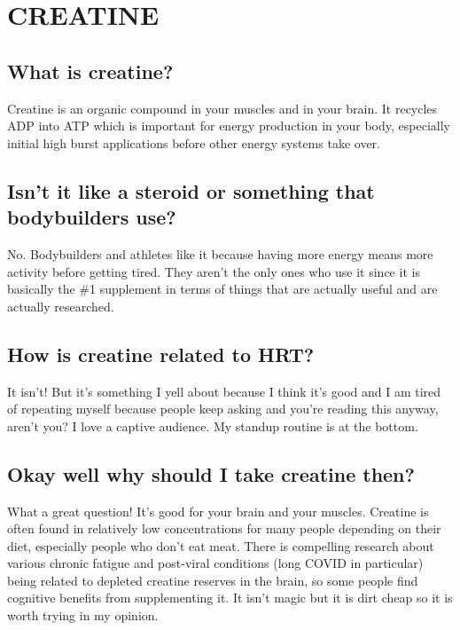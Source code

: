 \documentclass{article}
\begin{document}
\section{CREATINE}

\subsection{What is creatine?}

Creatine is an organic compound in your muscles and in your brain. It recycles ADP into ATP which is important for energy production in your body, especially initial high burst applications before other energy systems take over.

\subsection{Isn’t it like a steroid or something that bodybuilders use?}

No. Bodybuilders and athletes like it because having more energy means more activity before getting tired. They aren’t the only ones who use it since it is basically the \#1 supplement in terms of things that are actually useful and are actually researched. 

\subsection{How is creatine related to HRT?}

It isn’t! But it’s something I yell about because I think it’s good and I am tired of repeating myself because people keep asking and you’re reading this anyway, aren’t you? I love a captive audience. My standup routine is at the bottom.

\subsection{Okay well why should I take creatine then?}

What a great question! It’s good for your brain and your muscles. Creatine is often found in relatively low concentrations for many people depending on their diet, especially people who don’t eat meat. There is compelling research about various chronic fatigue and post-viral conditions (long COVID in particular) being related to depleted creatine reserves in the brain, so some people find cognitive benefits from supplementing it. It isn’t magic but it is dirt cheap so it is worth trying in my opinion.
\end{document}
